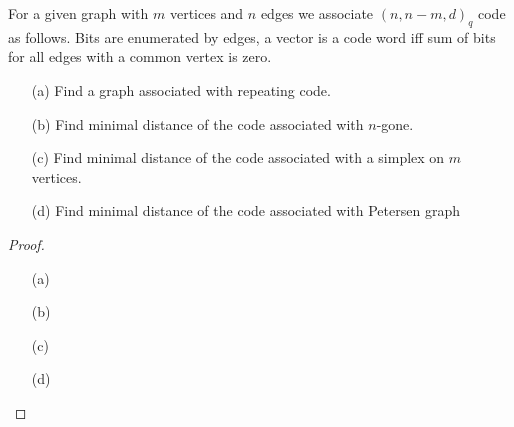 \begin{prob}
    For a given graph with $m$ vertices and $n$ edges we associate $(n, n-m, d)_q$ code as follows. Bits are enumerated by edges, a vector is a code word iff sum of bits for all edges with a common vertex is zero.
    \begin{itemize}
        \item[(a)] Find a graph associated with repeating code.
        \item[(b)] Find minimal distance of the code associated with $n$-gone.
        \item[(c)] Find minimal distance of the code associated with a simplex on $m$ vertices.
        \item[(d)] Find minimal distance of the code associated with Petersen graph
    \end{itemize}
\end{prob}

\begin{proof}
    \begin{itemize}
        \item[(a)] 
        \item[(b)] 
        \item[(c)] 
        \item[(d)] 
    \end{itemize}
\end{proof}
